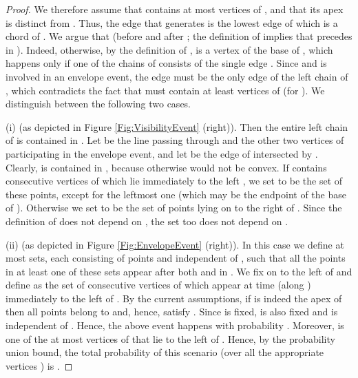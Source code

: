 \documentclass[11pt]{article}
\begin{document}
\begin{proof}
We therefore assume that  contains at most  vertices of
, and that its apex  is distinct from .
Thus, the edge  that  generates is the lowest edge of  which is a chord of . We argue that
 (before and after ; the definition of  implies that  precedes  in ). Indeed, otherwise, by the definition of
,  is a vertex of the base of , which
happens only if one of the chains of  consists of the single
edge . Since  and is involved in an envelope event, the edge  must be the only edge of the left chain of , which contradicts the fact that  must contain at least  vertices of
 (for ).  We distinguish between the following two cases.

(i)  (as depicted in Figure \ref{Fig:VisibilityEvent}
(right)). Then the entire left chain of  is contained in . Let  be the line passing through  and the
other two vertices of  participating in the envelope event,
and let  be the edge of  intersected by
. Clearly,  is contained in , because otherwise
 would not be convex.
If 
contains  consecutive vertices of
 which lie immediately to the left , we set  to be the set of these points, except for the leftmost one (which may be the endpoint of the base of ).
Otherwise we set  to be the set of  points lying on  to the right of . Since the definition of  does not depend on , the set  too does not depend on .

(ii)  (as depicted in Figure \ref{Fig:EnvelopeEvent} (right)). In this case we define at most  sets, each consisting of  points and independent of , such that all the points in at least one of these sets appear after both  and  in .
We fix  on  to the left of  and define 
as the set of  consecutive vertices of  which appear at time  (along ) immediately to the left of . By the current assumptions, if  is indeed the apex of  then all points  belong to  and, hence, satisfy . Since  is fixed,  is also fixed and is independent of . Hence, the above event happens with probability . 
Moreover,  is one of the at most  vertices of  that lie to the left of . Hence, by the probability union bound, the total probability of this scenario (over all the appropriate vertices ) is .


\end{proof}
\end{document}
